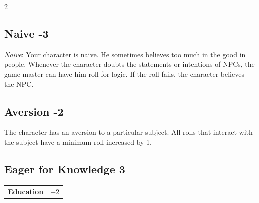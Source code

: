 \begin{multicols}{2}
\begin{tcolorbox}

\end{tcolorbox}

\begin{tcolorbox}
    \subsection*{Naive \hfill \small{-3 }}
    \tcblower
\textit{Naive}: Your character is naive. He sometimes believes too much in the good in people. Whenever the character doubts the statements or intentions of NPCs, the game master can have him roll for logic. If the roll fails, the character believes the NPC.


\vspace{3mm}



\end{tcolorbox}

\begin{tcolorbox}
    \subsection*{Aversion \hfill \small{-2 }}
    \tcblower
The character has an aversion to a particular subject. All rolls that interact with the subject have a minimum roll increased by 1.


\vspace{3mm}



\end{tcolorbox}

\begin{tcolorbox}
    \subsection*{Eager for Knowledge \hfill \small{3 }}
    \tcblower




\begin{tabular}{@{}ll@{}}
    \textbf{Education} & +2\\
\end{tabular}


\end{tcolorbox}
\end{multicols}
